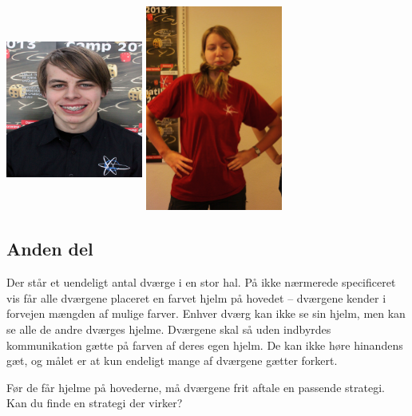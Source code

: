 \begin{minipage}[t]{100mm}
\includegraphics[width=45mm,height=67mm]{moa.jpg}
\includegraphics[width=45mm]{sabh.jpg}

\subsection*{Anden del}
Der står et uendeligt antal dværge i en stor hal. På ikke nærmerede specificeret vis får alle dværgene placeret en farvet hjelm på hovedet -- dværgene kender i forvejen mængden af mulige farver. Enhver dværg kan ikke se sin hjelm, men kan se alle de andre dværges hjelme. Dværgene skal så uden indbyrdes kommunikation gætte på farven af deres egen hjelm. De kan ikke høre hinandens gæt, og målet er at kun endeligt mange af dværgene gætter forkert.
 
Før de får hjelme på hovederne, må dværgene frit aftale en passende strategi. Kan du finde en strategi der virker?
\end{minipage}
